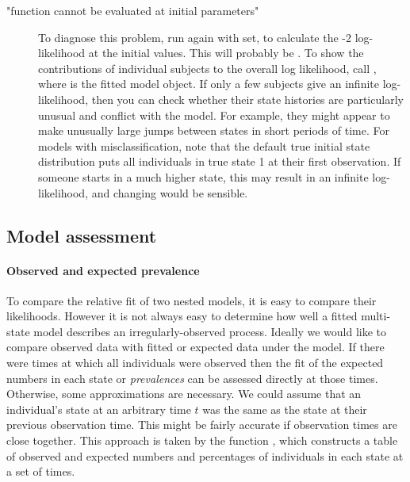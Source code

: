 \begin{description}
\item[ "function cannot be evaluated at initial parameters"]
  To diagnose this problem, run  again with
   set, to calculate the -2 log-likelihood at
  the initial values.  This will probably be . To show
  the contributions of individual subjects to the overall log
  likelihood, call , where
   is the fitted model object.  If only a few subjects give
  an infinite log-likelihood, then you can check whether their state
  histories are particularly unusual and conflict with the model.  For
  example, they might appear to make unusually large jumps between
  states in short periods of time.  For models with misclassification,
  note that the default true initial state distribution
   puts all individuals in true state 1 at their
  first observation.  If someone starts in a much higher state, this
  may result in an infinite log-likelihood, and changing
   would be sensible.


\end{description}


\subsection{Model assessment}
\label{sec:model-assessment}

\paragraph{Observed and expected prevalence}

To compare the relative fit of two nested models, it is easy to
compare their likelihoods.  However it is not always easy to determine
how well a fitted multi-state model describes an irregularly-observed
process.  Ideally we would like to compare observed data with fitted
or expected data under the model.  If there were times at which all
individuals were observed then the fit of the expected numbers in each
state or {\em prevalences} can be assessed directly at those times.
Otherwise, some approximations are necessary.  We could assume that an
individual's state at an arbitrary time $t$ was the same as the state
at their previous observation time.  This might be fairly accurate if
observation times are close together.  This approach is taken by the
function , which constructs a table of observed
and expected numbers and percentages of individuals in each state at a
set of times.

